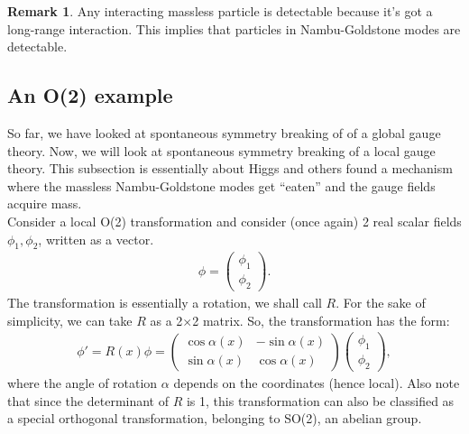 \documentclass[a4paper,11pt]{article}
\numberwithin{equation}{section}
\theoremstyle{definition}
\newtheorem{rmk}{Remark}[section]
\begin{document}
\begin{rmk}
	Any interacting massless particle is detectable because it's got a long-range interaction. This implies that particles in Nambu-Goldstone modes are detectable. 
\end{rmk}

\subsection{An O(2) example}
So far, we have looked at spontaneous symmetry breaking of of a global gauge theory. Now, we will look at spontaneous symmetry breaking of a local gauge theory. This subsection is essentially about Higgs and others found a mechanism where the massless Nambu-Goldstone modes get ``eaten'' and the gauge fields acquire mass. \\

Consider a local O(2) transformation and consider (once again) 2 real scalar fields $\phi_1, \phi_2$, written as a vector.
\begin{align}
\phi = \begin{pmatrix}
\phi_1 \\ \phi_2
\end{pmatrix}.
\end{align}
The transformation is essentially a rotation, we shall call $R$. For the sake of simplicity, we can take $R$ as a 2$\times$2 matrix. So, the transformation has the form:
\begin{align}
\phi' = R(x)\phi = \begin{pmatrix}
\cos\alpha(x)&-\sin\alpha(x)\\\sin\alpha(x)&\cos\alpha(x)
\end{pmatrix}\begin{pmatrix}
\phi_1 \\ \phi_2
\end{pmatrix},
\end{align}
where the angle of rotation $\alpha$ depends on the coordinates (hence local). Also note that since the determinant of $R$ is 1, this transformation can also be classified as a special orthogonal transformation, belonging to SO(2), an abelian group.\\
\end{document}
